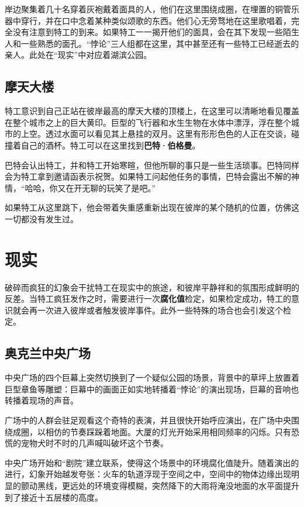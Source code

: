 岸边聚集着几十名穿着灰袍戴着面具的人，他们在这里围绕成圈，在埋置的铜管乐器中穿行，并在口中念着某种类似颂歌的东西。他们心无旁骛地在这里歌唱着，完全没有注意到特工的到来。如果特工一一揭开他们的面具，会在其下发现一些陌生人和一些熟悉的面孔。“悖论”三人组都在这里，其中甚至还有一些特工已经逝去的亲人。此处在“现实”中对应着湖滨公园。

\subsection{摩天大楼}

特工意识到自己正站在彼岸最高的摩天大楼的顶楼上，在这里可以清晰地看见覆盖在整个城市之上的巨大黄印。巨型的飞行器和水生生物在水体中漂浮，浮在整个城市的上空。透过水面可以看见其上悬挂的双月。这里有形形色色的人正在交谈，碰撞着自己的酒杯。特工可以在这里找到\textbf{巴特·伯格曼}。

巴特会认出特工，并和特工开始寒暄，但他所聊的事只是一些生活琐事。巴特同样会为特工拿到邀请函表示祝贺。如果特工问起他任务的事情，巴特会露出不解的神情，“哈哈，你又在开无聊的玩笑了是吧。”

如果特工从这里跳下，他会带着失重感重新出现在彼岸的某个随机的位置，仿佛这一切都没有发生过。

\section{现实}

破碎而疯狂的幻象会干扰特工在现实中的旅途，和彼岸平静祥和的氛围形成鲜明的反差。当特工疯狂发作之时，需要进行一次\textbf{腐化值}检定，如果检定成功，特工的意识就会再一次进入彼岸或者触发彼岸事件。此外一些特殊的场合也会引发这个检定。

\subsection{奥克兰中央广场}

中央广场的四个巨幕上突然切换到了一个疑似公园的场景，背景中的草坪上放置着巨型章鱼等雕塑：巨幕中的画面正如实地转播着“悖论”的演出现场，巨幕的音响也转播着现场的声音。

广场中的人群会驻足观看这个奇特的表演，并且很快开始呼应演出，在广场中央围绕成圈，以相仿的节奏踩跺着地面。大厦的灯光开始采用相同频率的闪烁。只有恐慌的宠物犬时不时的几声喊叫破坏这个节奏。

中央广场开始和“剧院”建立联系，使得这个场景中的环境腐化值陡升。随着演出的进行，幻象开始越发夸张：火车的轨道浮现于空间之中，空间中的物体边缘出现明显的颤动黑线，更远处的环境变得模糊，突然降下的大雨将淹没地面的水平面提升到了接近十五层楼的高度。

